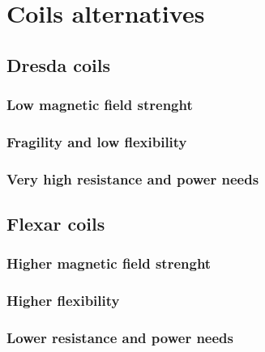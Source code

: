\section{Coils alternatives}

\subsection{Dresda coils}

\subsubsection{Low magnetic field strenght}

\subsubsection{Fragility and low flexibility}

\subsubsection{Very high resistance and power needs}


\subsection{Flexar coils}

\subsubsection{Higher magnetic field strenght}

\subsubsection{Higher flexibility}

\subsubsection{Lower resistance and power needs}

